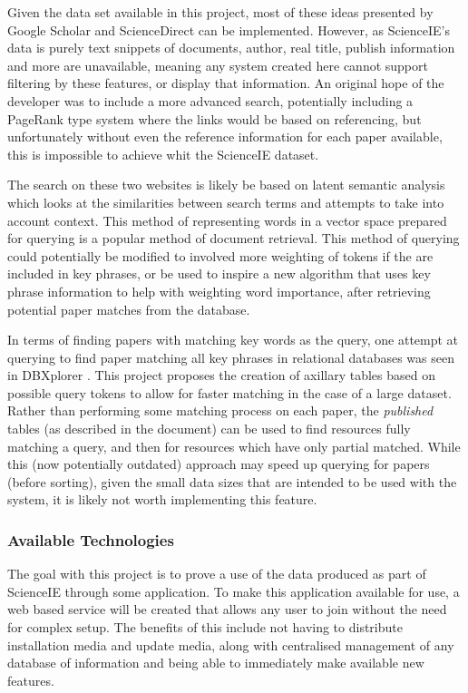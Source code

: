 Given the data set available in this project, most of these ideas presented by Google Scholar and ScienceDirect can be implemented. However, as ScienceIE's data is purely text snippets of documents, author, real title, publish information and more are unavailable, meaning any system created here cannot support filtering by these features, or display that information. An original hope of the developer was to include a more advanced search, potentially including a PageRank type system \cite{Page1998} where the links would be based on referencing, but unfortunately without even the reference information for each paper available, this is impossible to achieve whit the ScienceIE dataset.

The search on these two websites is likely be based on latent semantic analysis \cite{Landauer1998,AswaniKumar2012} which looks at the similarities between search terms and attempts to take into account context. This method of representing words in a vector space prepared for querying is a popular method of document retrieval. This method of querying could potentially be modified to involved more weighting of tokens if the are included in key phrases, or be used to inspire a new algorithm that uses key phrase information to help with weighting word importance, after retrieving potential paper matches from the database.

In terms of finding papers with matching key words as the query, one attempt at querying to find paper matching all key phrases in relational databases was seen in DBXplorer \cite{Agrawal2002}. This project proposes the creation of axillary tables based on possible query tokens to allow for faster matching in the case of a large dataset. Rather than performing some matching process on each paper, the \textit{published} tables (as described in the document) can be used to find resources fully matching a query, and then for resources which have only partial matched. While this (now potentially outdated) approach may speed up querying for papers (before sorting), given the small data sizes that are intended to be used with the system, it is likely not worth implementing this feature. 

\subsubsection*{Available Technologies}
The goal with this project is to prove a use of the data produced as part of ScienceIE through some application. To make this application available for use, a web based service will be created that allows any user to join without the need for complex setup. The benefits of this include not having to distribute installation media and update media, along with centralised management of any database of information and being able to immediately make available new features.

